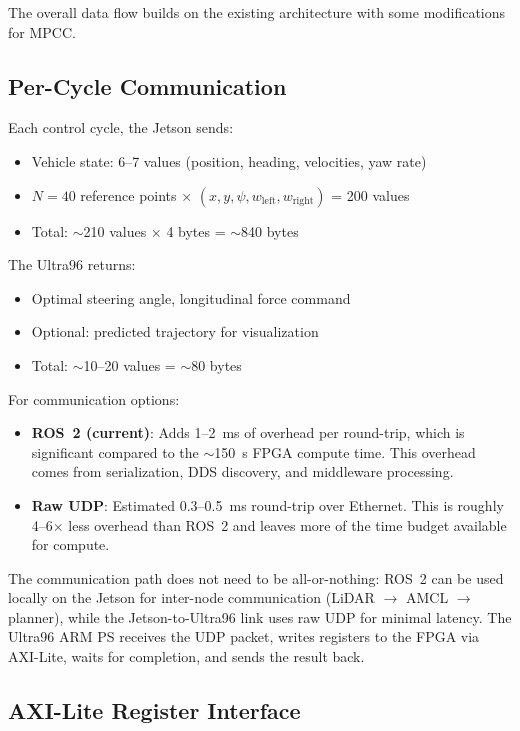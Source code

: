 \documentclass[12pt,a4paper]{article}
\begin{document}
The overall data flow builds on the existing architecture with some modifications for MPCC.

\subsection{Per-Cycle Communication}

Each control cycle, the Jetson sends:
\begin{itemize}
    \item Vehicle state: 6--7 values (position, heading, velocities, yaw rate)
    \item $N=40$ reference points $\times$ $(x, y, \psi, w_{\text{left}}, w_{\text{right}})$ = 200 values
    \item Total: $\sim$210 values $\times$ 4 bytes = $\sim$840 bytes
\end{itemize}

The Ultra96 returns:
\begin{itemize}
    \item Optimal steering angle, longitudinal force command
    \item Optional: predicted trajectory for visualization
    \item Total: $\sim$10--20 values = $\sim$80 bytes
\end{itemize}

For communication options:
\begin{itemize}
    \item \textbf{ROS~2 (current)}: Adds 1--2~ms of overhead per round-trip, which is significant compared to the $\sim$150~\textmu s FPGA compute time. This overhead comes from serialization, DDS discovery, and middleware processing.
    \item \textbf{Raw UDP}: Estimated 0.3--0.5~ms round-trip over Ethernet. This is roughly 4--6$\times$ less overhead than ROS~2 and leaves more of the time budget available for compute.
\end{itemize}

The communication path does not need to be all-or-nothing: ROS~2 can be used locally on the Jetson for inter-node communication (LiDAR $\rightarrow$ AMCL $\rightarrow$ planner), while the Jetson-to-Ultra96 link uses raw UDP for minimal latency. The Ultra96 ARM PS receives the UDP packet, writes registers to the FPGA via AXI-Lite, waits for completion, and sends the result back.

\subsection{AXI-Lite Register Interface}
\end{document}
